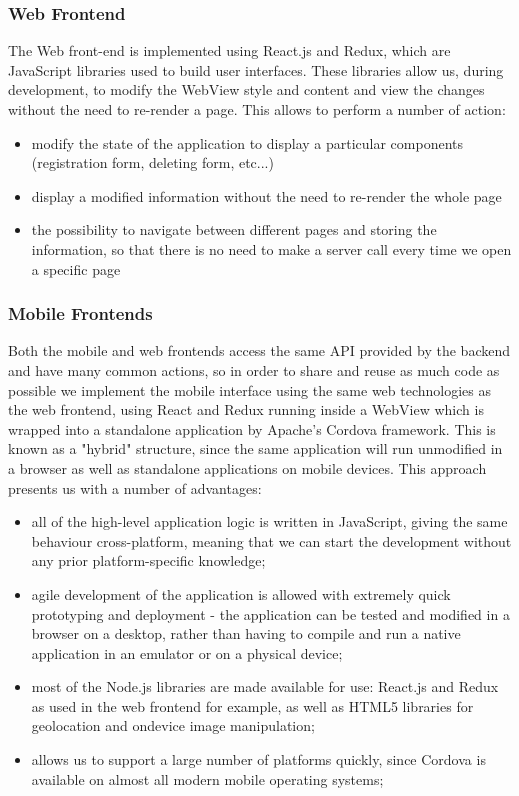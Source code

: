 \subsubsection{Web Frontend}
The Web front-end is implemented using React.js and Redux, which are JavaScript libraries used to build user interfaces. These libraries allow us, during development, to modify the WebView style and content and view the changes without the need to re-render a page. This allows to perform a number of action:

\begin{itemize}
	\item modify the state of the application to display a particular components (registration form, deleting form, etc...)
	\item display a modified information without the need to re-render the whole page
	\item the possibility to navigate between different pages and storing the information, so that there is no need to make a server call every time we open a specific page
\end{itemize}

\subsubsection{Mobile Frontends}

Both the mobile and web frontends access the same API provided by the backend and have many common actions, so in order to share and reuse as much code as possible we implement the mobile interface using the same web technologies as the web frontend, using React and Redux running inside a WebView which is wrapped into a standalone application by Apache's Cordova framework. This is known as a "hybrid" structure, since the same application will run unmodified in a browser as well as standalone applications on mobile devices. This approach presents us with a number of advantages:

\begin{itemize}
	\item all of the high-level application logic is written in JavaScript, giving the same behaviour cross-platform, meaning that we can start the development without any prior platform-specific knowledge;
	\item agile development of the application is allowed with extremely quick prototyping and deployment  - the application can be tested and modified in a browser on a desktop, rather than having to compile and run a native application in an emulator or on a physical device;
	\item most of the Node.js libraries are made available for use: React.js and Redux as used in the web frontend for example, as well as HTML5 libraries for geolocation and ondevice image manipulation;
	\item allows us to support a large number of platforms quickly, since Cordova is available on almost all modern mobile operating systems;
\end{itemize}

